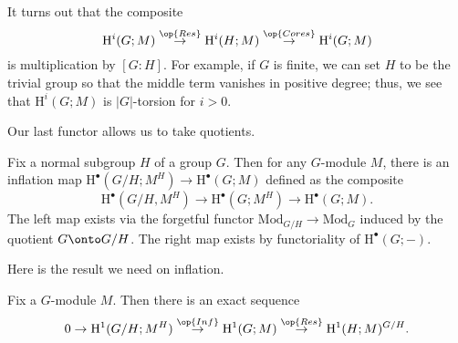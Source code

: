 \documentclass[../notes.tex]{subfiles}
\begin{document}
\begin{remark}
	It turns out that the composite
	\[\mathrm H^i(G;M)\stackrel{\op{Res}}\to\mathrm H^i(H;M)\stackrel{\op{Cores}}\to\mathrm H^i(G;M)\]
	is multiplication by $[G:H]$. For example, if $G$ is finite, we can set $H$ to be the trivial group so that the middle term vanishes in positive degree; thus, we see that $\mathrm H^i(G;M)$ is $\left|G\right|$-torsion for $i>0$.
\end{remark}
Our last functor allows us to take quotients.
\begin{definition}[inflation]
	Fix a normal subgroup $H$ of a group $G$. Then for any $G$-module $M$, there is an inflation map $\mathrm H^\bullet\left(G/H;M^H\right)\to\mathrm H^\bullet(G;M)$ defined as the composite
	\[\mathrm H^\bullet\left(G/H,M^H\right)\to\mathrm H^\bullet\left(G;M^H\right)\to\mathrm H^\bullet(G;M).\]
	The left map exists via the forgetful functor $\mathrm{Mod}_{G/H}\to\mathrm{Mod}_G$ induced by the quotient $G\onto G/H$. The right map exists by functoriality of $\mathrm H^\bullet(G;-)$.
\end{definition}
Here is the result we need on inflation.
\begin{proposition}
	Fix a $G$-module $M$. Then there is an exact sequence
	\[0\to\mathrm H^1(G/H;M^H)\stackrel{\op{Inf}}\to\mathrm H^1(G;M)\stackrel{\op{Res}}\to\mathrm H^1(H;M)^{G/H}.\]
\end{proposition}
\end{document}
